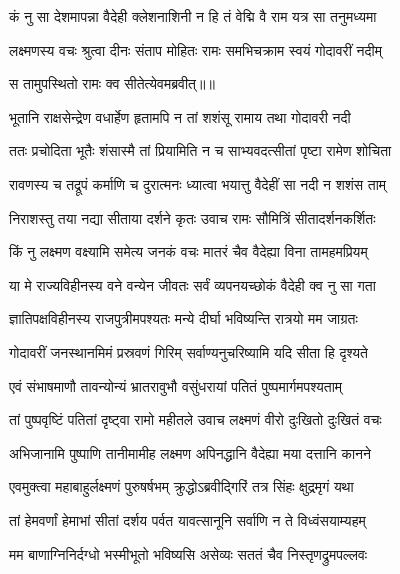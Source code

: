 \twolineshloka
{कं नु सा देशमापन्ना वैदेही क्लेशनाशिनी}
{न हि तं वेद्मि वै राम यत्र सा तनुमध्यमा} %

\twolineshloka
{लक्ष्मणस्य वचः श्रुत्वा दीनः संताप मोहितः}
{रामः समभिचक्राम स्वयं गोदावरीं नदीम्} %

{स तामुपस्थितो रामः क्व सीतेत्येवमब्रवीत्॥॥} %

\addtocounter{shlokacount}{1}

\twolineshloka
{भूतानि राक्षसेन्द्रेण वधार्हेण हृतामपि}
{न तां शशंसू रामाय तथा गोदावरी नदी} %

\twolineshloka
{ततः प्रचोदिता भूतैः शंसास्मै तां प्रियामिति}
{न च साभ्यवदत्सीतां पृष्टा रामेण शोचिता} %

\twolineshloka
{रावणस्य च तद्रूपं कर्माणि च दुरात्मनः}
{ध्यात्वा भयात्तु वैदेहीं सा नदी न शशंस ताम्} %

\twolineshloka
{निराशस्तु तया नद्या सीताया दर्शने कृतः}
{उवाच रामः सौमित्रिं सीतादर्शनकर्शितः} %

\twolineshloka
{किं नु लक्ष्मण वक्ष्यामि समेत्य जनकं वचः}
{मातरं चैव वैदेह्या विना तामहमप्रियम्} %

\twolineshloka
{या मे राज्यविहीनस्य वने वन्येन जीवतः}
{सर्वं व्यपनयच्छोकं वैदेही क्व नु सा गता} %

\twolineshloka
{ज्ञातिपक्षविहीनस्य राजपुत्रीमपश्यतः}
{मन्ये दीर्घा भविष्यन्ति रात्रयो मम जाग्रतः} %

\twolineshloka
{गोदावरीं जनस्थानमिमं प्रस्रवणं गिरिम्}
{सर्वाण्यनुचरिष्यामि यदि सीता हि दृश्यते} %

\twolineshloka
{एवं संभाषमाणौ तावन्योन्यं भ्रातरावुभौ}
{वसुंधरायां पतितं पुष्पमार्गमपश्यताम्} %

\twolineshloka
{तां पुष्पवृष्टिं पतितां दृष्ट्वा रामो महीतले}
{उवाच लक्ष्मणं वीरो दुःखितो दुःखितं वचः} %

\twolineshloka
{अभिजानामि पुष्पाणि तानीमामीह लक्ष्मण}
{अपिनद्धानि वैदेह्या मया दत्तानि कानने} %

\twolineshloka
{एवमुक्त्वा महाबाहुर्लक्ष्मणं पुरुषर्षभम्}
{क्रुद्धोऽब्रवीद्गिरिं तत्र सिंहः क्षुद्रमृगं यथा} %

\twolineshloka
{तां हेमवर्णां हेमाभां सीतां दर्शय पर्वत}
{यावत्सानूनि सर्वाणि न ते विध्वंसयाम्यहम्} %

\twolineshloka
{मम बाणाग्निनिर्दग्धो भस्मीभूतो भविष्यसि}
{असेव्यः सततं चैव निस्तृणद्रुमपल्लवः} %

